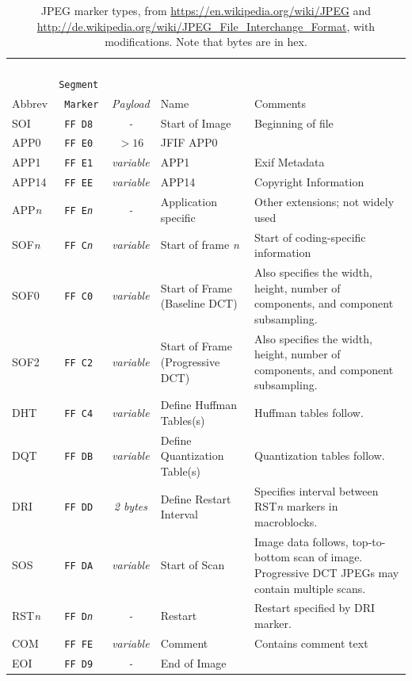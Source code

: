 
\begin{table}
\begin{tabularx}{\textwidth}{l>{\tt}l>{\it}clX}
       & \rm Segment &         &      & \\
Abbrev & \rm Marker  & Payload & Name & Comments\\
\hline
\hline
SOI  & FF D8 &        - & Start of Image & Beginning of file \\
\hline
\hline
APP0 & FF E0 &  $>16$   & JFIF APP0                        & \\
\hline
APP1 & FF E1 & variable & APP1                             & Exif Metadata\\
\hline
APP14 & FF EE & variable & APP14 & Copyright Information\\
\hline
APP\it{n} & FF E\it{n}& - & Application specific           & Other extensions; not widely used\\
\hline
\hline
SOF\it{n} & FF C\it{n} & variable & Start of frame \emph{n}& Start of coding-specific information\\
\hline
SOF0 & FF C0 & variable & Start of Frame (Baseline DCT)    & Also specifies the width, height, number of components, and component subsampling. \\
\hline
SOF2 & FF C2 & variable & Start of Frame (Progressive DCT) & Also specifies the width, height, number of components, and component subsampling. \\
\hline
DHT  & FF C4 & variable & Define Huffman Tables(s)         & Huffman tables follow.\\
\hline
\hline
DQT  & FF DB & variable & Define Quantization Table(s)     & Quantization tables follow.\\
\hline
DRI  & FF DD & 2 bytes  & Define Restart Interval          & Specifies interval between RST\emph{n} markers in macroblocks.\\
\hline
SOS  & FF DA & variable & Start of Scan                    & Image data follows, top-to-bottom scan of image. Progressive DCT JPEGs may contain multiple scans.\\
\hline
RST\it{n} & FF D\it{n}& - & Restart                        & Restart specified by DRI marker.\\
\hline
COM & FF FE & variable  & Comment                          &   Contains comment text\\
\hline
EOI & FF D9 & -         & End of Image\\
\hline
\hline
\end{tabularx}
\caption{JPEG marker types, from
  \url{https://en.wikipedia.org/wiki/JPEG} and
  \url{http://de.wikipedia.org/wiki/JPEG_File_Interchange_Format},  with modifications. Note
  that bytes are in hex.}\label{tab:jpeg-format}
\end{table}


